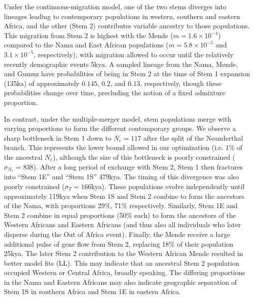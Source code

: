\documentclass{article}
\begin{document}
Under the continuous-migration model, one of the two stems diverges into
lineages leading to contemporary populations in western, southern and eastern
Africa, and the other (Stem 2) contributes variable ancestry to those
populations. This migration from Stem 2 is highest with the Mende
($m=1.6\times10^{-4}$) compared to the Nama and East African populations
($m=5.8\times10^{-5}$ and $3.1\times10^{-5}$, respectively), with migration
allowed to occur until the relatively recently demographic events 5kya. A
sampled lineage from the Nama, Mende, and Gumuz have probabilities of being in
Stem 2 at the time of Stem 1 expansion (135ka) of approximately $0.145$, $0.2$,
and $0.13$, respectively, though these probabilities change over time,
precluding the notion of a fixed admixture proportion.

In contrast, under the multiple-merger model, stem populations merge with
varying proportions to form the different contemporary groups. 
We observe a sharp bottleneck in Stem 1 down to $N_e=117$ after the split of
the Neanderthal branch. This represents the lower bound allowed in our
optimization (i.e. 1\% of the ancestral $N_e$), although the size of this
bottleneck is poorly constrained ($\sigma_{N_e}=838$). After a long period of
exchange with Stem 2, Stem 1 then fractures into “Stem 1E” and “Stem 1S”
479kya. The timing of this divergence was also poorly constrained ($\sigma_T=
166$kya). These populations evolve independently until approximately 119kya
when Stem 1S and Stem 2 combine to form the ancestors of the Nama, with
proportions 29\%, 71\% respectively. Similarly, Stem 1E and Stem 2 combine in
equal proportions (50\% each) to form the ancestors of the Western Africans and
Eastern Africans (and thus also all individuals who later disperse during the
Out of Africa event). Finally, the Mende receive a large additional pulse of
gene flow from Stem 2, replacing 18\% of their population 25kya. The later Stem
2 contribution to the Western African Mende resulted in better model fits (LL).
This may indicate that an ancestral Stem 2 population occupied Western or
Central Africa, broadly speaking. The differing proportions in the Nama and
Eastern Africans may also indicate geographic separation of Stem 1S in southern
Africa and Stem 1E in eastern Africa. 
\end{document}
